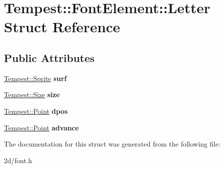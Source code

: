 \hypertarget{struct_tempest_1_1_font_element_1_1_letter}{\section{Tempest\+:\+:Font\+Element\+:\+:Letter Struct Reference}
\label{struct_tempest_1_1_font_element_1_1_letter}
}
\subsection*{Public Attributes}
\begin{DoxyCompactItemize}
\item 
\hypertarget{struct_tempest_1_1_font_element_1_1_letter_ac12348263fa0f19dd21740c2f8a1d6dc}{\hyperlink{class_tempest_1_1_sprite}{Tempest\+::\+Sprite} {\bfseries surf}}\label{struct_tempest_1_1_font_element_1_1_letter_ac12348263fa0f19dd21740c2f8a1d6dc}

\item 
\hypertarget{struct_tempest_1_1_font_element_1_1_letter_a1d750a9243d7b789a120dd2e47d4e92c}{\hyperlink{struct_tempest_1_1_size}{Tempest\+::\+Size} {\bfseries size}}\label{struct_tempest_1_1_font_element_1_1_letter_a1d750a9243d7b789a120dd2e47d4e92c}

\item 
\hypertarget{struct_tempest_1_1_font_element_1_1_letter_ad8d38c1fdf898e1086170ed1b1c13219}{\hyperlink{struct_tempest_1_1_point}{Tempest\+::\+Point} {\bfseries dpos}}\label{struct_tempest_1_1_font_element_1_1_letter_ad8d38c1fdf898e1086170ed1b1c13219}

\item 
\hypertarget{struct_tempest_1_1_font_element_1_1_letter_a628edad2f210cc4a8f1e09b7f459adab}{\hyperlink{struct_tempest_1_1_point}{Tempest\+::\+Point} {\bfseries advance}}\label{struct_tempest_1_1_font_element_1_1_letter_a628edad2f210cc4a8f1e09b7f459adab}

\end{DoxyCompactItemize}


The documentation for this struct was generated from the following file\+:\begin{DoxyCompactItemize}
\item 
2d/font.\+h\end{DoxyCompactItemize}

